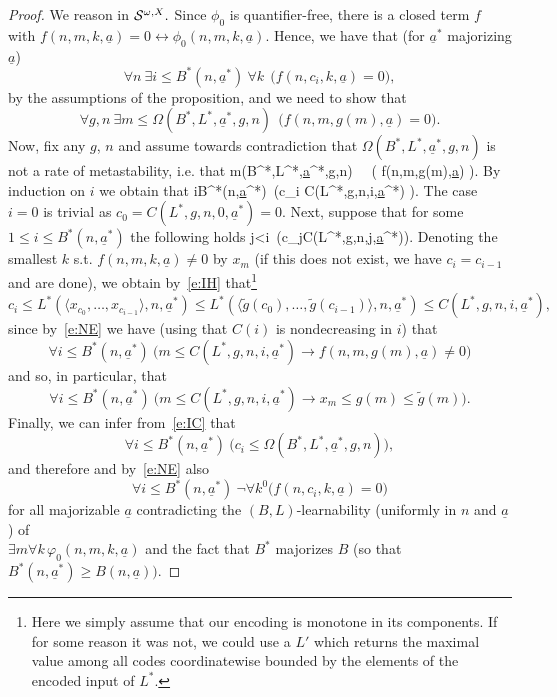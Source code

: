\begin{proof} We reason in ${\cal S}^{\omega,X}.$
Since $\phi_0$ is quantifier-free, there is a closed term $f$ with 
$f(n,m,k,\underline{a})=0\leftrightarrow \phi_0(n,m,k,\underline{a})$. 
Hence, we have that (for $\underline{a}^*$ majorizing $\underline{a}$) 
\[ \forall n\ \exists i\leq B^*(n,\underline{a}^*)\ \forall k\ \ \big( 
f(n,c_i,k,\underline{a})=0 \big), \]
by the assumptions of the proposition, and we need to show that
\[ \forall g,n\ \exists m\leq \Omega(B^*,L^*,\underline{a}^*,g,n) 
\ \ \big( f(n,m,g(m),\underline{a})=0 \big). \]
Now, fix any $g$, $n$ and assume towards contradiction that 
$\Omega(B^*,L^*,\underline{a}^*,g,n)$ is not a rate of metastability, i.e. that
\be[e:NE] 
\forall m\leq \Omega(B^*,L^*,\underline{a}^*,g,n)  \ \ \big( f(n,m,g(m),\underline{a}) \big).
\ee
By induction on $i$ we obtain that
\be[e:IC] 
\forall i\leq B^*(n,\underline{a}^*) \,\big(c_i\leq 
C(L^*,g,n,i,\underline{a}^*)
\big).
\ee
The case $i=0$ is trivial as $c_0=C(L^*,g,n,0,\underline{a}^*)=0$. 
Next, suppose that for some 
$1\leq i\leq B^*(n,\underline{a}^*)$ the following holds
\be[e:IH] 
\forall j<i\ \big(c_j\leq C(L^*,g,n,j,\underline{a}^*)\big). 
\ee
Denoting the smallest $k$ s.t. $f(n,m,k,\underline{a})\neq0$ by $x_m$ 
(if this does not exist, we have $c_i=c_{i-1}$ and are done), 
we obtain by~\eqref{e:IH} that\footnote{Here
we simply assume that our encoding is monotone in its components. If for some reason it was not, we could use a $L'$ which returns
the maximal value among all codes coordinatewise bounded by the elements of the encoded input of $L^*$.}
\[
   c_i\leq L^*(\langle x_{c_0},\ldots,x_{c_{i-1}}\rangle, n,\underline{a}^*)
   \leq L^*(\langle \tilde g({c_0}),\ldots,\tilde g({c_{i-1}})\rangle, n,\underline{a}^*)\le C(L^*,g,n,i,\underline{a}^*),
\]
since by~\eqref{e:NE} we have (using that $C(i)$ is nondecreasing in $i$) 
that \[ \forall i\leq B^*(n,\underline{a}^*)\ 
\big(m\leq C(L^*,g,n,i,\underline{a}^*)\rightarrow f(n,m,g(m),\underline{a})\neq0 \big)\] and 
so, in particular, that
\[ \forall i\leq B^*(n,\underline{a}^*)\ \big(m\leq C(L^*,g,n,i,\underline{a}^*)
\rightarrow x_m\leq g(m)\leq \tilde g(m) \big). \]
Finally, we can infer from~\eqref{e:IC} that
\[ \forall i\leq B^*(n,\underline{a}^*)\ 
\big(c_i\leq \Omega(B^*,L^*,\underline{a}^*,g,n)\big),\]
and therefore and by~\eqref{e:NE} also
\[ \forall i\leq B^*(n,\underline{a}^*)\ \neg\forall k^0\big( 
f(n,c_i,k,\underline{a})=0\big) \]
for all majorizable $\underline{a}$ contradicting the $(B,L)$-learnability 
(uniformly in $n$ and $\underline{a}$) of \\ 
$\exists m\forall k\,\varphi_0(n,m,k,\underline{a})$ and the fact that $B^*$ 
majorizes $B$ (so that $B^*(n,\underline{a}^*)\ge B(n,\underline{a})).$

\end{proof}

